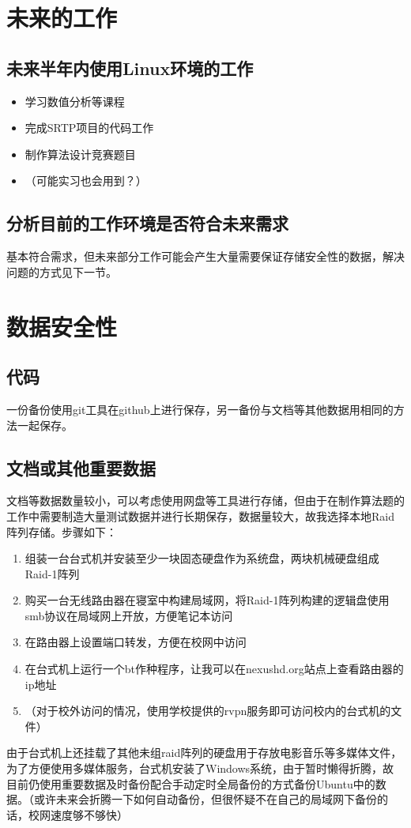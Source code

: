 \documentclass{article}
\begin{document}
\section{未来的工作}
    \subsection{未来半年内使用Linux环境的工作}
    \begin{itemize}
        \item 学习数值分析等课程
        \item 完成SRTP项目的代码工作
        \item 制作算法设计竞赛题目
        \item （可能实习也会用到？）
    \end{itemize}
    \subsection{分析目前的工作环境是否符合未来需求}
        基本符合需求，但未来部分工作可能会产生大量需要保证存储安全性的数据，解决问题的方式见下一节。
    
\section{数据安全性}
    \subsection{代码}
        一份备份使用git工具在github上进行保存，另一备份与文档等其他数据用相同的方法一起保存。
    \subsection{文档或其他重要数据}
        文档等数据数量较小，可以考虑使用网盘等工具进行存储，但由于在制作算法题的工作中需要制造大量测试数据并进行长期保存，数据量较大，故我选择本地Raid阵列存储。步骤如下：
        \begin{enumerate}
            \item 组装一台台式机并安装至少一块固态硬盘作为系统盘，两块机械硬盘组成Raid-1阵列
            \item 购买一台无线路由器在寝室中构建局域网，将Raid-1阵列构建的逻辑盘使用smb协议在局域网上开放，方便笔记本访问
            \item 在路由器上设置端口转发，方便在校网中访问
            \item 在台式机上运行一个bt作种程序，让我可以在nexushd.org站点上查看路由器的ip地址
            \item （对于校外访问的情况，使用学校提供的rvpn服务即可访问校内的台式机的文件）
        \end{enumerate}

        由于台式机上还挂载了其他未组raid阵列的硬盘用于存放电影音乐等多媒体文件，为了方便使用多媒体服务，台式机安装了Windows系统，由于暂时懒得折腾，故目前仍使用重要数据及时备份配合手动定时全局备份的方式备份Ubuntu中的数据。（或许未来会折腾一下如何自动备份，但很怀疑不在自己的局域网下备份的话，校网速度够不够快）

     
\end{document}
